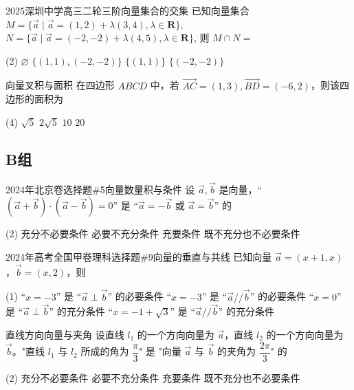 \begin{choice}{2025深圳中学高三二轮三阶}{向量集合的交集}
	已知向量集合 $M=\{\vec{a} \mid \vec{a}=(1,2)+\lambda(3,4), \lambda \in \mathbf{R}\}$, $N=\{\vec{a} \mid \vec{a}=(-2,-2)+\lambda(4,5), \lambda \in \mathbf{R}\}$, 则 $M \cap N=$
	\begin{tasks}(2)
		\task $\varnothing$
		\task $\{(1,1),(-2,-2)\}$
		\task $\{(1,1)\}$
		\task $\{(-2,-2)\}$
	\end{tasks}
\end{choice}

\begin{choice}{}{向量叉积与面积}
	在四边形 $ABCD$ 中，若 $\vec{AC} = (1,3), \vec{BD} = (-6,2)$，则该四边形的面积为
	\begin{tasks}(4)
		\task $\sqrt{5}$
		\task $2\sqrt{5}$
		\task $10$
		\task $20$
	\end{tasks}
\end{choice}

\subsection*{B组}

\begin{choice}{2024年北京卷选择题\#5}{向量数量积与条件}
	设 $\vec{a},\vec{b}$ 是向量，``$(\vec{a}+\vec{b})\cdot(\vec{a}-\vec{b})=0$'' 是 ``$\vec{a}=-\vec{b}$ 或 $\vec{a}=\vec{b}$'' 的
	\begin{tasks}(2)
		\task 充分不必要条件
		\task 必要不充分条件
		\task 充要条件
		\task 既不充分也不必要条件
	\end{tasks}
\end{choice}

\begin{choice}{2024年高考全国甲卷理科选择题\#9}{向量的垂直与共线}
	已知向量 $\vec{a}=(x+1,x)$，$\vec{b}=(x,2)$，则
	\begin{tasks}(1)
		\task ``$x=-3$'' 是 ``$\vec{a}\perp\vec{b}$'' 的必要条件
		\task ``$x=-3$'' 是 ``$\vec{a}//\vec{b}$'' 的必要条件
		\task ``$x=0$'' 是 ``$\vec{a}\perp\vec{b}$'' 的充分条件
		\task ``$x=-1+\sqrt{3}$'' 是 ``$\vec{a}//\vec{b}$'' 的充分条件
	\end{tasks}
\end{choice}

\begin{choice}{}{直线方向向量与夹角}
	设直线 $l_1$ 的一个方向向量为 $\vec{a}$，直线 $l_2$ 的一个方向向量为 $\vec{b}$。"直线 $l_1$ 与 $l_2$ 所成的角为 $\dfrac{\pi}{3}$" 是 "向量 $\vec{a}$ 与 $\vec{b}$ 的夹角为 $\dfrac{2\pi}{3}$" 的
	\begin{tasks}(2)
		\task 充分不必要条件
		\task 必要不充分条件
		\task 充要条件
		\task 既不充分也不必要条件
	\end{tasks}
\end{choice}

